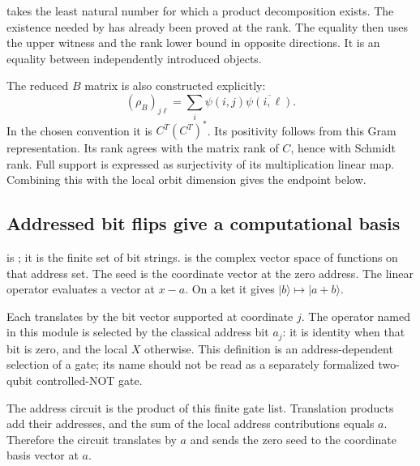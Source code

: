 
 takes the least natural number for which a product decomposition exists. The existence needed by  has already been proved at the rank. The equality  then uses the upper witness and the rank lower bound in opposite directions. It is an equality between independently introduced objects.

The reduced $B$ matrix is also constructed explicitly:
\[
(\rho_B)_{j\ell}=\sum_i\psi(i,j)\overline{\psi(i,\ell)}.
\]
In the chosen convention it is $C^T(C^T)^*$. Its positivity follows from this Gram representation. Its rank agrees with the matrix rank of $C$, hence with Schmidt rank. Full support is expressed as surjectivity of its multiplication linear map. Combining this with the local orbit dimension gives the endpoint below.



\subsection{Addressed bit flips give a computational basis}
 is ; it is the finite set of bit strings.  is the complex vector space of functions on that address set. The seed is the coordinate vector at the zero address. The linear operator  evaluates a vector at $x-a$. On a ket it gives $|b\rangle\mapsto|a+b\rangle$.

Each  translates by the bit vector supported at coordinate $j$. The operator named  in this module is selected by the classical address bit $a_j$: it is identity when that bit is zero, and the local $X$ otherwise. This definition is an address-dependent selection of a gate; its name should not be read as a separately formalized two-qubit controlled-NOT gate.

The address circuit is the product of this finite gate list. Translation products add their addresses, and the sum of the local address contributions equals $a$. Therefore the circuit translates by $a$ and sends the zero seed to the coordinate basis vector at $a$.

